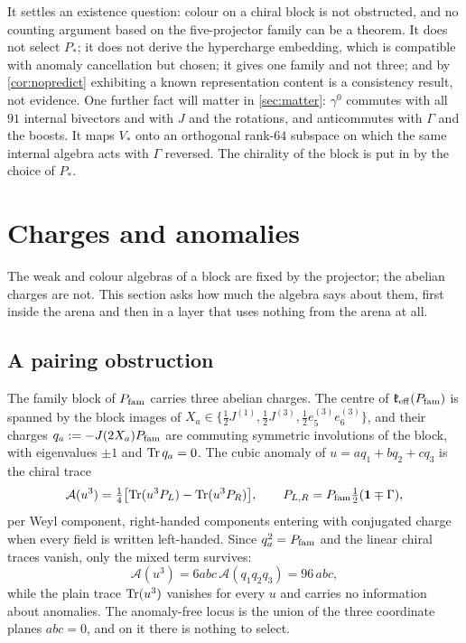 \begin{remark}
\label{rem:PSsettles}
It settles an existence question: colour on a chiral block is not obstructed, and no counting argument based on the five-projector family
can be a theorem. It does not select $P_*$; it does not derive the hypercharge embedding, which is compatible with anomaly cancellation but
chosen; it gives one family and not three; and by \cref{cor:nopredict} exhibiting a known representation content is a consistency result,
not evidence. One further fact will matter in \cref{sec:matter}: $\gamma^0$ commutes with all $91$ internal bivectors and with $J$ and the
rotations, and anticommutes with $\Gamma$ and the boosts. It maps $V_*$ onto an orthogonal rank-$64$ subspace on which the same internal
algebra acts with $\Gamma$ reversed. The chirality of the block is put in by the choice of $P_*$.
\end{remark}



\section{Charges and anomalies}
\label{sec:charges}

The weak and colour algebras of a block are fixed by the projector; the abelian charges are not. This section asks how much the
algebra says about them, first inside the arena and then in a layer that uses nothing from the arena at all.

\subsection{A pairing obstruction}
\label{sec:pairing}

The family block of $P_{\rm fam}$ carries three abelian charges. The centre of $\mathfrak k_{\rm eff}(P_{\rm fam})$ is spanned by the block images of
$X_a\in\{\tfrac12J^{(1)},\tfrac12J^{(3)},\tfrac12e^{(3)}_5e^{(3)}_6\}$, and their charges $q_a:=-J(2X_a)P_{\rm fam}$ are commuting symmetric
involutions of the block, with eigenvalues $\pm1$ and $\operatorname{Tr} q_a=0$. The cubic anomaly of $u=aq_1+bq_2+cq_3$ is the chiral trace
\[
\mathcal A(u^3)=\tfrac14\bigl[\operatorname{Tr}(u^3P_L)-\operatorname{Tr}(u^3P_R)\bigr],\qquad P_{L,R}=P_{\rm fam}\tfrac12(\mathbf 1\mp\Gamma),
\]
per Weyl component, right-handed components entering with conjugated charge when every field is written left-handed. Since
$q_a^2=P_{\rm fam}$ and the linear chiral traces vanish, only the mixed term survives:
\[
\mathcal A(u^3)=6abc\,\mathcal A(q_1q_2q_3)=96\,abc ,
\]
while the plain trace $\operatorname{Tr}(u^3)$ vanishes for every $u$ and carries no information about anomalies. The anomaly-free locus is the union
of the three coordinate planes $abc=0$, and on it there is nothing to select.

